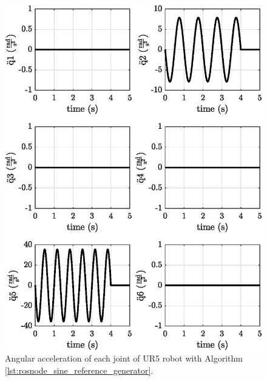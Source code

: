 \begin{figure}[H]
    \centering
    \includegraphics{images/act_1.1/joint_acceleration.eps}
    \caption{Angular acceleration of each joint of UR5 robot with Algorithm \ref{lst:rosnode_sine_reference_generator}.}
    \label{fig:act_1.1_joint_acceleration}
\end{figure}